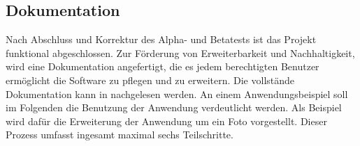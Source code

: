 \subsection{Dokumentation}
\label{sec:Dokumentation}

Nach Abschluss und Korrektur des Alpha- und Betatests ist das Projekt funktional abgeschlossen. Zur Förderung von Erweiterbarkeit und Nachhaltigkeit, wird eine Dokumentation angefertigt, die es jedem berechtigten Benutzer ermöglicht die Software zu pflegen und zu erweitern. Die vollstände Dokumentation kann in \citet{dokumentation2014} nachgelesen werden. 
An einem Anwendungsbeispiel soll im Folgenden die Benutzung der Anwendung verdeutlicht werden. Als Beispiel wird dafür die Erweiterung der Anwendung um ein Foto vorgestellt. Dieser Prozess umfasst ingesamt maximal sechs Teilschritte.

